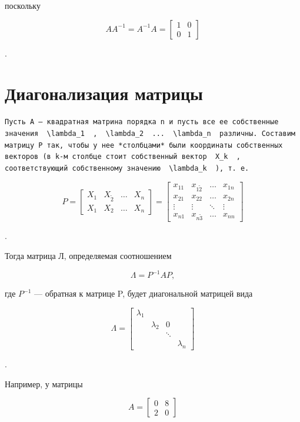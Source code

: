 \documentclass[
  ukrainian,
]{article}
\begin{document}
поскольку

\[
AA^{-1} = A^{-1}A =
\begin{bmatrix} 1 & 0 \\ 0 & 1 \end{bmatrix}
\]

.

\section{Диагонализация
матрицы}\label{ux434ux438ux430ux433ux43eux43dux430ux43bux438ux437ux430ux446ux438ux44f-ux43cux430ux442ux440ux438ux446ux44b}

\begin{verbatim}
Пусть A — квадратная матрина порядка n и пусть все ее собственные значения  \lambda_1  ,  \lambda_2  ...  \lambda_n  различны. Составим матрицу P так, чтобы у нее *столбцами* были координаты собственных векторов (в k-м столбце стоит собственный вектор  X_k  , соответствующий собственному значению  \lambda_k  ), т. е.
\end{verbatim}

\[
P =
\begin{bmatrix} X_1 & X_{\tilde{2}} & \dots & X_n \\ X_{1} & X_{2} & \dots & X_n \end{bmatrix}
=
\begin{bmatrix} x_{11} & x_{1\tilde{2}} & \dots & x_{1n} \\ x_{21} & x_{22} & \dots & x_{2n} \\ \vdots & \vdots & \ddots & \vdots \\ x_{n1} & x_{n\tilde{3}} & \dots & x_{nn} \end{bmatrix}
\]

.

Тогда матрица Л, определяемая соотношением

\[
\Lambda = P^{-1}AP,
\]

где \(P^{-1}\) --- обратная к матрице P, будет диагональной матрицей
вида

\[
\Lambda =
\begin{bmatrix} \lambda_1 & & & \\ & \lambda_2 & 0 & \\ & & \ddots & \\ & & & \lambda_n \end{bmatrix}
\]

.

Например, у матрицы

\[
A =
\begin{bmatrix} 0 & 8 \\ 2 & 0 \end{bmatrix}
\]
\end{document}
